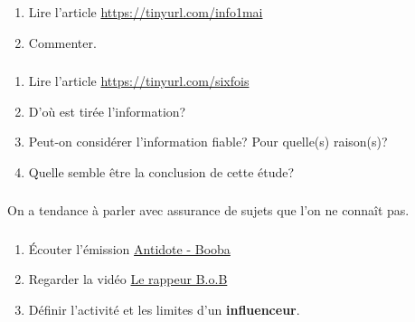 \documentclass[svgnames,11pt]{beamer}
\begin{document}
\begin{frame}
    \frametitle{}
\begin{activite}
\begin{enumerate}
    \item Lire l'article \url{https://tinyurl.com/info1mai}
    \item Commenter.
\end{enumerate}
\end{activite}
    

\end{frame}
\begin{frame}
    \frametitle{}

    \begin{activite}
        \begin{enumerate}
            \item Lire l'article \url{https://tinyurl.com/sixfois}
            \item D'où est tirée l'information?
            \item Peut-on considérer l'information fiable? Pour quelle(s) raison(s)?
            \item Quelle semble être la conclusion de cette étude?
        \end{enumerate}
        \end{activite}

\end{frame}
\begin{frame}
    \frametitle{}

    \begin{aretenir}[Biais 3]
    \centering On a tendance à parler avec assurance de sujets que l'on ne connaît pas.
    \end{aretenir}
\end{frame}
\begin{frame}
    \frametitle{}
\begin{activite}
\begin{enumerate}
    \item Écouter l'émission \href{https://www.franceinter.fr/embed/player/aod/8d4e5c50-df6a-4189-a4a3-3453bf875477}{Antidote - Booba}
    \item Regarder la vidéo \href{https://www.sciencesetavenir.fr/videos/le-rappeur-qui-croyait-que-la-terre-etait-plate-a-definitivement-perdu-la-partie_l3vzx8}{Le rappeur B.o.B}
    \item Définir l'activité et les limites d'un \textbf{influenceur}.
\end{enumerate}
\end{activite}
    

\end{frame}
\end{document}

